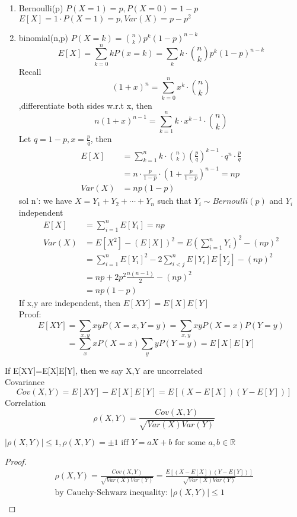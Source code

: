 \begin{example}[]{}
 \begin{enumerate}[label=\circled{\arabic*}] 
 \item Bernoulli(p) $P(X=1)=p,P(X=0)=1-p $\\
 $ E[X]=1 \cdot P(X=1)=p, Var(X)=p-p^2$
 \item binomial(n,p) $ P(X=k)=\binom{n}{k}p^k(1-p)^{n-k} $\\
 $$ E[X]=\sum_{k=0}^{n}kP(x=k)=\sum_{k}k\cdot \binom{n}{k}p^k(1-p)^{n-k}$$
 Recall $$ (1+x)^n= \sum_{k=0}^n x^k\cdot \binom{n}{k}$$,differentiate both sides w.r.t x, then $$ n(1+x)^{n-1}=\sum_{k=1}^n k\cdot x^{k-1}\cdot \binom{n}{k} $$
 Let $q=1-p,x=\frac{p}{q}$, then \begin{align*}{}{}
     E[X]&=\sum_{k=1}^{n}k\cdot \binom{n}{k}(\frac{p}{q})^{k-1}\cdot q^n\cdot \frac{p}{q}\\
     &= n\cdot \frac{p}{1-p}\cdot (1+\frac{p}{1-p})^{n-1}=np\\
     Var(X)&=np(1-p)
    \end{align*}
    sol n': we have $ X=Y_1+Y_2+\cdots+Y_n $  such that $ Y_i\sim Bernoulli(p) $ and $ Y_i $ independent \begin{align*}{}{}
    E[X]&=\sum_{i=1}^{n}E[Y_i]=np\\
    Var(X)&=E[X^2]-(E[X])^2=E(\sum_{i=1}^{n}Y_i)^2-(np)^2\\
    &=\sum_{i=1}^{n}E[Y_i]^2-2\sum_{i<j}^{n}E[Y_i]E[Y_j]-(np)^2\\
    &=np+2p^2\frac{n(n-1)}{2}-(np)^2\\
    &=np(1-p)
    \end{align*}
    If x,y are independent, then $ E[XY]=E[X]E[Y] $
    \\Proof: $$ E[XY]=\sum_{x,y}xyP(X=x,Y=y)=\sum_{x,y}xyP(X=x)P(Y=y)$$ $$=\sum_{x}xP(X=x)\sum_{y}yP(Y=y)=E[X]E[Y] $$
 \end{enumerate}
\end{example}
\begin{definition}[]{}
If E[XY]=E[X]E[Y], then we say X,Y are uncorrelated\\
Covariance $$
    Cov(X,Y)=E[XY]-E[X]E[Y]=E[(X-E[X])(Y-E[Y])]
$$ 
Correlation $$
    \rho(X,Y)=\frac{Cov(X,Y)}{\sqrt{Var(X)Var(Y)}}
$$
\end{definition}
\begin{lemma}[]{}
$|\rho(X,Y)|\leq 1,\rho(X,Y)=\pm 1\text{ iff }Y=aX+b \text{ for some }a,b \in \mathbb{R}$
\end{lemma}
\begin{proof}
    \begin{align*}{}{}
        \rho(X,Y)=\frac{Cov(X,Y)}{\sqrt{Var(X)Var(Y)}}=\frac{E[(X-E[X])(Y-E[Y])]}{\sqrt{Var(X)Var(Y)}}\\
        \text{by Cauchy-Schwarz inequality: } |\rho(X,Y)|\leq 1\\
    \end{align*}
\end{proof}
